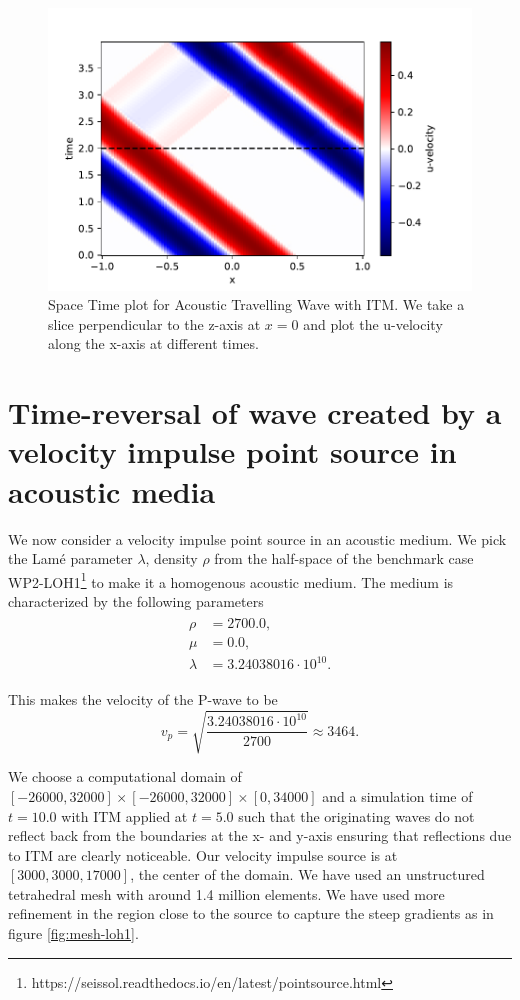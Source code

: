 \begin{figure}[!htpb]
    \centering
    \includegraphics[width=0.75\linewidth]{figures/space-time-plot-travelling.pdf}
    \caption{Space Time plot for Acoustic Travelling Wave with \ac{ITM}. We take a slice perpendicular to the z-axis at $x=0$ and plot the u-velocity along the x-axis at different times.}
    \label{fig:space-timeplot-travelling}
\end{figure}

\section{Time-reversal of wave created by a velocity impulse point source in acoustic media} \label{sec:acousticITM}

We now consider a velocity impulse point source in an acoustic medium. We pick the Lam\'{e} parameter $\lambda$, density $\rho$ 
from the half-space of the benchmark case WP2-LOH1\footnote[1]{https://seissol.readthedocs.io/en/latest/pointsource.html} to make it a homogenous acoustic medium. 
The medium is characterized by the following parameters
\begin{align}
    \begin{split}
        \rho &=    2700.0 ,\\
        \mu &=     0.0 ,\\
        \lambda &= 3.24038016 \cdot 10^{10} .
    \end{split}
\end{align}

This makes the velocity of the P-wave to be
\begin{equation}
    v_p = \sqrt{\frac{3.24038016 \cdot 10^{10}}{2700}} \approx 3464 .
\end{equation}

We choose a computational domain of $\left[-26000,32000\right] \times \left[-26000,32000\right] \times \left[0,34000\right]$ and a simulation time of $t=10.0$ with \ac{ITM} applied at $t=5.0$ 
such that the originating waves do not reflect back from the boundaries at the x- and y-axis ensuring that
reflections due to \ac{ITM} are clearly noticeable. Our velocity impulse source is at $\left[3000,3000,17000\right]$, the center of the domain. 
We have used an unstructured tetrahedral mesh with around 1.4 million elements. We have used more refinement in the region close to the source to capture the steep gradients as in figure \ref{fig:mesh-loh1}.


